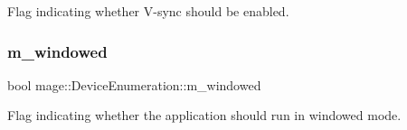 Flag indicating whether V-\/sync should be enabled. \hypertarget{classmage_1_1_device_enumeration_a277c5dae7861c9cb1175192a61274cc9}{}\label{classmage_1_1_device_enumeration_a277c5dae7861c9cb1175192a61274cc9} 
\subsubsection{\texorpdfstring{m\+\_\+windowed}{m\_windowed}}
{\footnotesize\ttfamily bool mage\+::\+Device\+Enumeration\+::m\+\_\+windowed\hspace{0.3cm}{\ttfamily [private]}}

Flag indicating whether the application should run in windowed mode. 